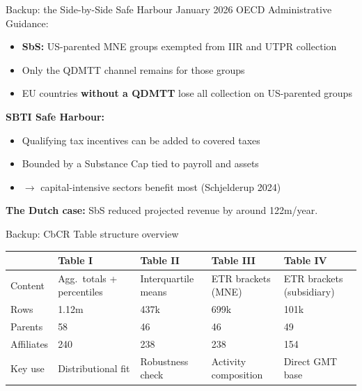 \documentclass[aspectratio=169, 11pt]{beamer}
\newcommand{\emphbx}[1]{\textcolor{Bordeaux}{\textbf{#1}}}
\newcommand{\EUR}{\texteuro}
\begin{document}
\begin{frame}{Backup: the Side-by-Side Safe Harbour}
January 2026 OECD Administrative Guidance:
\begin{itemize}
  \item \textbf{SbS:} US-parented MNE groups exempted from IIR and UTPR collection
  \item Only the QDMTT channel remains for those groups
  \item EU countries \emphbx{without a QDMTT} lose all collection on US-parented groups
\end{itemize}

\vspace{0.5em}
\textbf{SBTI Safe Harbour:}
\begin{itemize}
  \item Qualifying tax incentives can be added to covered taxes
  \item Bounded by a Substance Cap tied to payroll and assets
  \item $\to$ capital-intensive sectors benefit most (Schjelderup 2024)
\end{itemize}

\vspace{0.5em}
\textbf{The Dutch case:} SbS reduced projected revenue by around \EUR122m/year.
\end{frame}


\begin{frame}{Backup: CbCR Table structure overview}
\begin{center}
\footnotesize
\begin{tabular}{@{}lL{2.5cm}L{2.5cm}L{2.5cm}L{3cm}@{}}
  \toprule
  & \textbf{Table I} & \textbf{Table II} & \textbf{Table III} & \textbf{Table IV} \\
  \midrule
  Content & Agg.\ totals + percentiles & Interquartile means & ETR brackets (MNE) & ETR brackets (subsidiary) \\
  Rows & 1.12m & 437k & 699k & 101k \\
  Parents & 58 & 46 & 46 & 49 \\
  Affiliates & 240 & 238 & 238 & 154 \\
  Key use & Distributional fit & Robustness check & Activity composition & Direct GMT base \\
  \bottomrule
\end{tabular}
\end{center}
\end{frame}
\end{document}
